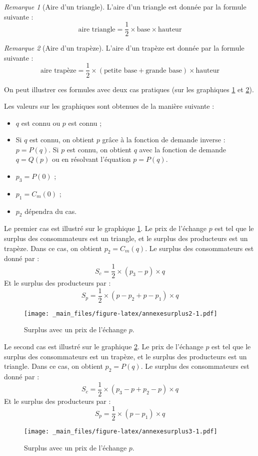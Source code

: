 \documentclass[
]{book}
\providecommand{\tightlist}{%
  \setlength{\itemsep}{0pt}\setlength{\parskip}{0pt}}
\theoremstyle{definition}
\theoremstyle{definition}
\theoremstyle{definition}
\theoremstyle{definition}
\theoremstyle{remark}
\newtheorem*{remark}{Remarque}
\begin{document}
\begin{remark}[Aire d'un triangle]
L'aire d'un triangle est donnée par la formule suivante :
\[\text{aire triangle}=\frac{1}{2}\times\text{base}\times\text{hauteur}\]
\end{remark}

\begin{remark}[Aire d'un trapèze]
L'aire d'un trapèze est donnée par la formule suivante :
\[\text{aire trapèze}=\frac{1}{2}\times(\text{petite base}+\text{grande base})\times\text{hauteur}\]
\end{remark}

On peut illustrer ces formules avec deux cas pratiques (sur les graphiques \ref{fig:annexesurplus2} et \ref{fig:annexesurplus3}).

Les valeurs sur les graphiques sont obtenues de la manière suivante :

\begin{itemize}
\tightlist
\item
  \(q\) est connu ou \(p\) est connu ;
\item
  Si \(q\) est connu, on obtient \(p\) grâce à la fonction de demande inverse : \(p=P(q)\).
  Si \(p\) est connu, on obtient \(q\) avec la fonction de demande \(q=Q(p)\) ou en résolvant l'équation \(p=P(q)\).
\item
  \(p_3=P(0)\) ;
\item
  \(p_1=C_m(0)\) ;
\item
  \(p_2\) dépendra du cas.
\end{itemize}

Le premier cas est illustré sur le graphique \ref{fig:annexesurplus2}.
Le prix de l'échange \(p\) est tel que le surplus des consommateurs est un triangle, et le surplus des producteurs est un trapèze.
Dans ce cas, on obtient \(p_2= C_m(q)\).
Le surplus des consommateurs est donné par :
\[
S_c=\frac{1}{2}\times(p_3-p)\times q
\]
Et le surplus des producteurs par :
\[
S_p=\frac{1}{2}\times(p-p_2+p-p_1)\times q
\]

\begin{figure}
\centering
\texttt{[image: \_main\_files/figure-latex/annexesurplus2-1.pdf]}
\caption{\label{fig:annexesurplus2}Surplus avec un prix de l'échange \(p\).}
\end{figure}

Le second cas est illustré sur le graphique \ref{fig:annexesurplus3}.
Le prix de l'échange \(p\) est tel que le surplus des consommateurs est un trapèze, et le surplus des producteurs est un triangle.
Dans ce cas, on obtient \(p_2= P(q)\).
Le surplus des consommateurs est donné par :
\[
S_c=\frac{1}{2}\times(p_3-p+p_2-p)\times q
\]
Et le surplus des producteurs par :
\[
S_p=\frac{1}{2}\times(p-p_1)\times q
\]

\begin{figure}
\centering
\texttt{[image: \_main\_files/figure-latex/annexesurplus3-1.pdf]}
\caption{\label{fig:annexesurplus3}Surplus avec un prix de l'échange \(p\).}
\end{figure}

  
\end{document}

